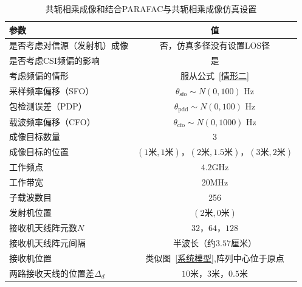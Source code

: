 \begin{table}[htb]
      \begin{center}
          \caption{共轭相乘成像和结合PARAFAC与共轭相乘成像仿真设置}\label{共轭相乘成像和结合PARAFAC与共轭相乘成像}
          \begin{tabular}{lc} %
              \toprule
              参数 & 值 \\
              \midrule
              是否考虑对信源（发射机）成像 & 否，仿真多径没有设置LOS径\\
              是否考虑CSI频偏的影响 & 是\\
              考虑频偏的情形  & 服从公式~\eqref{情形二}\\
              采样频率偏移（SFO）   &   $\theta_{\text{sfo}}\sim N(0,100)$ Hz\\
              包检测误差（PDP）     &   $\theta_{\text{pdd}}\sim N(0,100)$ Hz\\
              载波频率偏移（CFO）   &   $\theta_{\text{cfo}}\sim N(0,1000)$ Hz\\
              成像目标数量    & 3\\
              成像目标的位置  & $(1\text{米},1\text{米})$，$(2\text{米},1.5\text{米})$，$(3\text{米},2\text{米})$ \\
              工作频点        & $4.2$GHz\\
              工作带宽      & 20MHz \\
              子载波数目      & 256\\
              发射机位置           & $(2\text{米},0\text{米})$\\
              接收机天线阵元数$N$      & $32$，$64$，$128$\\
              接收机天线阵元间隔    & 半波长（约$3.57$厘米）\\
              接收机位置           & 类似图~\ref{系统模型},阵列中心位于原点\\
              两路接收天线的位置差$\Delta_d$ & $10$米，$3$米，$0.5$米\\
              \bottomrule
          \end{tabular}
      \end{center}
\end{table}

